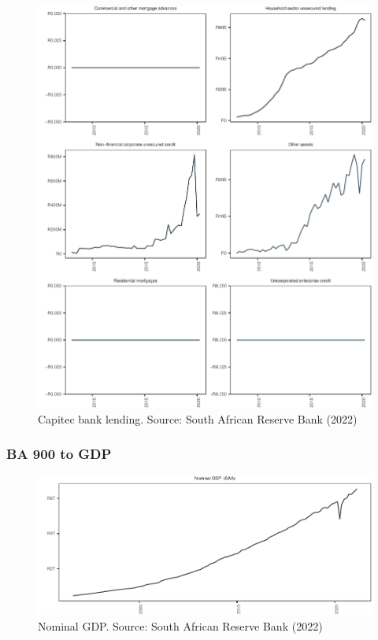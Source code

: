 \documentclass[
]{article}
\begin{document}
\begin{figure}[H]

\includegraphics{Bank_capital_and_bank_lending_files/figure-latex/ba900capitec-1} \hfill{}

\caption{Capitec bank lending. Source: South African Reserve Bank (2022)}\label{fig:ba900capitec}
\end{figure}

\hypertarget{ba-900-to-gdp}{%
\subsubsection{BA 900 to GDP}\label{ba-900-to-gdp}}

\begin{figure}[H]

\includegraphics{Bank_capital_and_bank_lending_files/figure-latex/nominal-1} \hfill{}

\caption{Nominal GDP. Source: South African Reserve Bank (2022)}\label{fig:nominal}
\end{figure}
\end{document}
